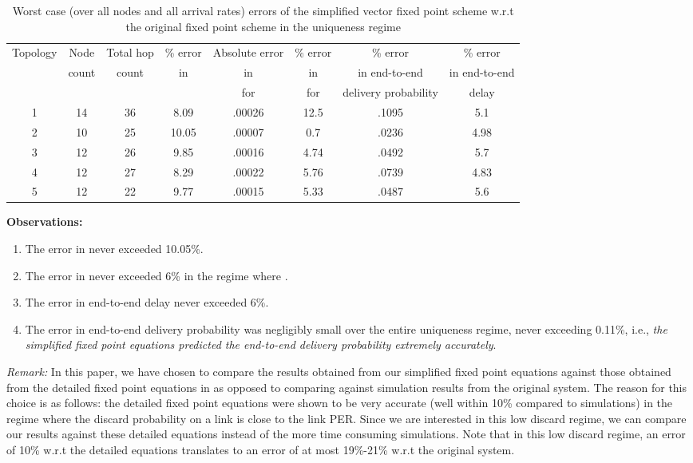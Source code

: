 \documentclass[12pt, draftclsnofoot, onecolumn]{IEEEtran}
\newcommand{\remark}[1]{{\emph{Remark:}} #1}
\newcommand{\gap}{\vspace{2mm}}
\begin{document}
\begin{table*}[ht]
  \centering
\caption{Worst case (over all nodes and all arrival rates) errors of the simplified vector fixed point scheme w.r.t the original fixed point scheme in the uniqueness regime}
\label{tbl:accuracy-vector-fp}
\footnotesize
  \begin{tabular}{|c|c|c|c|c|c|c|c|}\hline
    Topology & Node & Total hop & \% error  & Absolute error & \% error & \% error & \% error \\
& count & count & in  &  in  & in  & in end-to-end & in end-to-end \\
& & & & for  & for  & delivery probability & delay\\
 \hline
    1 & 14 & 36 & 8.09 & .00026 & 12.5 & .1095 & 5.1\\
 \hline
    2 & 10 & 25 & 10.05 & .00007 & 0.7 & .0236 & 4.98\\
 \hline	
    3 & 12 & 26 & 9.85 & .00016 & 4.74 & .0492 & 5.7\\
 \hline
    4 & 12 & 27 & 8.29 & .00022 & 5.76 & .0739 & 4.83\\
 \hline
    5 & 12 & 22 & 9.77 & .00015 & 5.33 & .0487 & 5.6\\  
  \hline
\end{tabular}
\normalsize
\end{table*}

\gap
\noindent
\textbf{Observations:} 
\begin{enumerate}
\item The error in  never exceeded 10.05\%.
\item The error in  never exceeded 6\% in the regime where .
\item The error in end-to-end delay never exceeded 6\%. 
\item The error in end-to-end delivery probability was negligibly small over the entire uniqueness regime, never exceeding 0.11\%, i.e., \emph{the simplified fixed point equations predicted the end-to-end delivery probability extremely accurately}. 
\end{enumerate} 

\gap
\noindent
\remark In this paper, we have chosen to compare the results obtained from our simplified fixed point equations against those obtained from the detailed fixed point equations in \cite{srivastava} as opposed to comparing against simulation results from the original system. The reason for this choice is as follows: the detailed fixed point equations were shown to be very accurate (well within 10\% compared to simulations) in the regime where the discard probability on a link is close to the link PER. Since we are interested in this low discard regime, we can compare our results against these detailed equations instead of the more time consuming simulations. Note that in this low discard regime, an error of 10\% w.r.t the detailed equations translates to an error of at most 19\%-21\% w.r.t the original system.   
\end{document}
